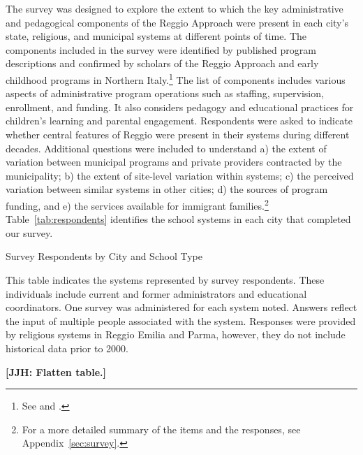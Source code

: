 The survey was designed to explore the extent to which the key administrative and pedagogical components of the Reggio Approach were present in each city's state, religious, and municipal systems at different points of time. The components included in the survey were identified by published program descriptions and confirmed by scholars of the Reggio Approach and early childhood programs in Northern Italy.\footnote{See \citet{Edwards-etal-eds_1998_Hundred-Languages} and \citet{Corsaro_2008_Policy-Practice}.} The list of components includes various aspects of administrative program operations such as staffing, supervision, enrollment, and funding. It also considers pedagogy and educational practices for children's learning and parental engagement. Respondents were asked to indicate whether central features of Reggio were present in their systems during different decades. Additional questions were included to understand a) the extent of variation between municipal programs and private providers contracted by the municipality; b) the extent of site-level variation within systems; c) the perceived variation between similar systems in other cities; d) the sources of program funding, and e) the services available for immigrant families.\footnote{For a more detailed summary of the items and the responses, see Appendix~\ref{sec:survey}.} Table~\ref{tab:respondents} identifies the school systems in each city that completed our survey.

\begin{table}[H]
\centering
\caption{Survey Respondents by City and School Type}\label{tab:respondents}
\begin{threeparttable}
	
\begin{tablenotes}
This table indicates the systems represented by survey respondents. These individuals include current and former administrators and educational coordinators. One survey was administered for each system noted. Answers reflect the input of multiple people associated with the system. Responses were provided by religious systems in Reggio Emilia and Parma, however, they do not include historical data prior to 2000.
\end{tablenotes}
\end{threeparttable}
\end{table}

\textbf{[JJH: Flatten table.]}

